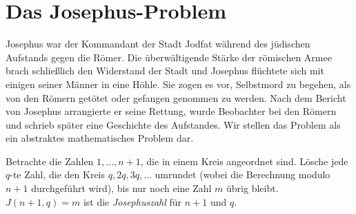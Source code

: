 
\section{Das Josephus-Problem}\label{s.josephus}

Josephus war der Kommandant der Stadt Jodfat während des jüdischen Aufstands gegen die Römer. Die überwältigende Stärke der römischen Armee brach schließlich den Widerstand der Stadt und Josephus flüchtete sich mit einigen seiner Männer in eine Höhle. Sie zogen es vor, Selbstmord zu begehen, als von den Römern getötet oder gefangen genommen zu werden. Nach dem Bericht von Josephus arrangierte er seine Rettung, wurde Beobachter bei den Römern und schrieb später eine Geschichte des Aufstandes. Wir stellen das Problem als ein abstraktes mathematisches Problem dar.

\begin{definition}
Betrachte die Zahlen $1,\ldots,n\!+\!1$, die in einem Kreis angeordnet sind. Lösche jede $q$-te Zahl, die den Kreis $q, 2q, 3q, \ldots$ umrundet (wobei die Berechnung modulo $n\!+\!1$ durchgeführt wird), bis nur noch eine Zahl $m$ übrig bleibt. $J(n+1,q)=m$ ist die \emph{Josephuszahl} für $n+1$ und $q$.
\end{definition}

